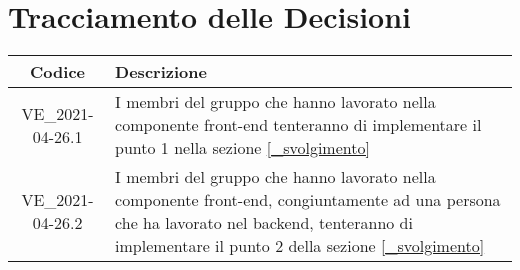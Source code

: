 \section*{Tracciamento delle Decisioni}

\begin{center}
	\begin{longtable}{|c|p{13cm}|}
	\hline
	\rowcolor{lighter-grayer}
	\textbf{Codice} & \textbf{Descrizione} \\
	\hline
	\endfirsthead
	\hline
	VE\_2021-04-26.1 & I membri del gruppo che hanno lavorato nella componente front-end tenteranno di implementare il punto 1 nella sezione \ref{_svolgimento} \\
	VE\_2021-04-26.2 & I membri del gruppo che hanno lavorato nella componente front-end, congiuntamente ad una persona che ha lavorato nel backend, tenteranno di
					   implementare il punto 2 della sezione \ref{_svolgimento} \\
	\hline

	\end{longtable}
\end{center}
